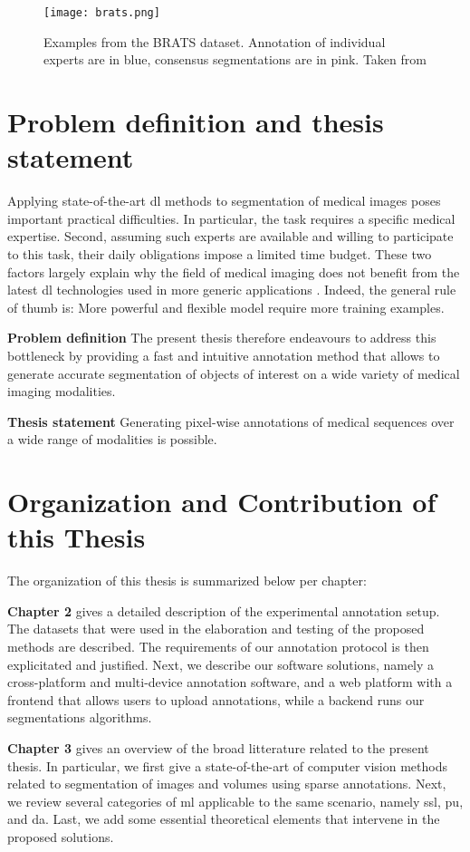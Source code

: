 \begin{figure}[!htpb]
  \texttt{[image: brats.png]}
  \caption{Examples from the BRATS dataset. Annotation of individual experts are in blue, consensus segmentations are in pink. Taken from \cite{menze15}}
  \label{fig:brats}
\end{figure}

\section{Problem definition and thesis statement}

Applying state-of-the-art \gls{dl} methods to segmentation of medical images poses important practical difficulties.
In particular, the task requires a specific medical expertise.
Second, assuming such experts are available and willing to participate to this task, their daily obligations impose a limited time budget.
These two factors largely explain why the field of medical imaging does not benefit from the latest \gls{dl} technologies used in more generic applications \cite{orting19}.
Indeed, the general rule of thumb is: More powerful and flexible model require more training examples.

\textbf{Problem definition}
The present thesis therefore endeavours to address this bottleneck by providing a
fast and intuitive annotation method that allows to generate accurate segmentation of objects of interest on a wide variety of medical imaging modalities.

\textbf{Thesis statement}
Generating pixel-wise annotations of medical sequences over a wide range of modalities is possible.

\section{Organization and Contribution of this Thesis}
The organization of this thesis is summarized below per chapter:

\textbf{Chapter 2} gives a detailed description of the experimental annotation setup.
The datasets that were used in the elaboration and testing of the proposed methods are described.
The requirements of our annotation protocol is then explicitated and justified.
Next, we describe our software solutions, namely a cross-platform and multi-device annotation software, and a web platform with a frontend that allows users to upload annotations, while a backend runs our segmentations algorithms.

\textbf{Chapter 3} gives an overview of the broad litterature related to the present thesis.
In particular, we first give a state-of-the-art of computer vision methods related to segmentation of images and volumes using sparse annotations.
Next, we review several categories of \gls{ml} applicable to the same scenario, namely \gls{ssl}, \gls{pu}, and \gls{da}.
Last, we add some essential theoretical elements that intervene in the proposed solutions.

